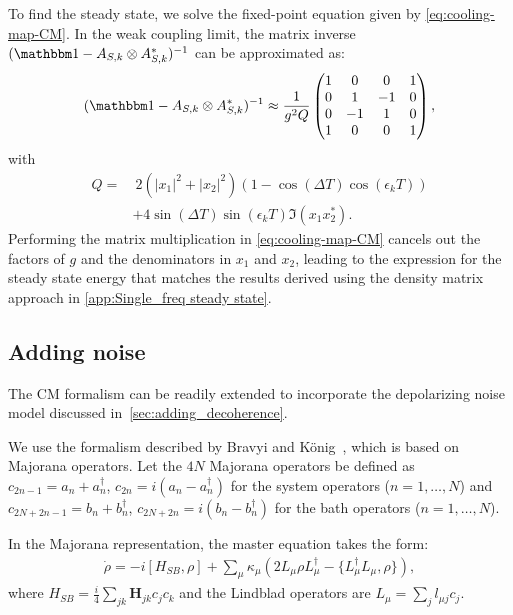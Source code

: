 To find the steady state, we solve the fixed-point equation given by \cref{eq:cooling-map-CM}. In the weak coupling limit, the matrix inverse $(\Id - A_{S,k} \otimes A_{S,k}^*)^{-1}$ can be approximated as:
\begin{equation}
    (\Id - A_{S,k} \otimes A_{S,k}^*)^{-1} \approx \frac{1}{g^2 Q} \begin{pmatrix}
        1 &0  &0  &1\\
        0 &1  &-1 &0\\
        0 &-1 &1  &0\\
        1 &0  &0  &1
    \end{pmatrix},
    \label{eq:inverse_matrix}
\end{equation}
with
\begin{align}
    Q = &\ 2(|x_1|^2 + |x_2|^2)(1 - \cos(\Delta T) \cos(\epsilon_k T))\nonumber\\
        &+4 \sin(\Delta T) \sin(\epsilon_k T) \Im(x_1 x^*_2).\label{eq:Q_definition}
\end{align}
Performing the matrix multiplication in \cref{eq:cooling-map-CM} cancels out the factors of $g$ and the denominators in $x_1$ and $x_2$, leading to the expression for the steady state energy that matches the results derived using the density matrix approach in \cref{app:Single_freq steady state}.

\subsection{Adding noise}

The CM formalism can be readily extended to incorporate the depolarizing noise model discussed in~\cref{sec:adding_decoherence}.

We use the formalism described by Bravyi and König~\cite{Bravyi2012Classical}, which is based on Majorana operators. Let the $4N$ Majorana operators be defined as $c_{2n-1}=a_n+a_n^\dag$, $c_{2n}=i(a_n-a_n^\dag)$ for the system operators ($n=1,\ldots,N$) and $c_{2N+2n-1}=b_n+b_n^\dag$, $c_{2N+2n}=i(b_n-b_n^\dag)$ for the bath operators ($n=1,\ldots,N$).

In the Majorana representation, the master equation takes the form:
\begin{align}
    \dot{\rho}=-i[H_{SB},\rho]+\sum_\mu \kappa_\mu (2L_\mu\rho L_\mu^\dag-\{L_\mu^\dag L_\mu,\rho\}),
\end{align}
where $H_{SB}=\frac{i}{4}\sum_{jk}\textbf{H}_{jk}c_j c_k$ and the Lindblad operators are $L_{\mu}=\sum_j l_{\mu j}c_j$.


